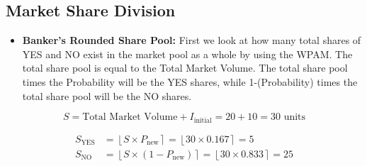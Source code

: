 \documentclass{article}
\begin{document}

\subsection*{Market Share Division}

\begin{itemize}
    \item \textbf{Banker's Rounded Share Pool:} First we look at how many total shares of YES and NO exist in the market pool as a whole by using the WPAM. The total share pool is equal to the Total Market Volume. The total share pool times the Probability will be the YES shares, while 1-(Probability) times the total share pool will be the NO shares.
\end{itemize}

\[
S = \text{Total Market Volume} + I_{\text{initial}} = 20 + 10 = 30 \text{ units}
\]


\begin{align*}
S_{\text{YES}} &= \left\lfloor S \times P_{\text{new}} \right\rceil = \left\lfloor 30 \times 0.167 \right\rceil = 5 \\
S_{\text{NO}} &= \left\lfloor S \times (1 - P_{\text{new}}) \right\rceil = \left\lfloor 30 \times 0.833 \right\rceil = 25
\end{align*}


\begin{center}
\end{center}

\begin{center}
\end{center}
\end{document}
